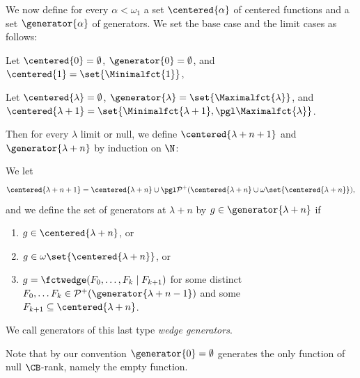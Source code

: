 We now define for every $\alpha<\omega_1$ a set $\centered{\alpha}$ of centered functions and a set $\generator{\alpha}$ of generators. 
We set the base case and the limit cases as follows:
\begin{descThm}
\item[Base case] Let $\centered{0}=\emptyset$, $\generator{0}=\emptyset$, and
$\centered{1}=\set{\Minimalfct{1}}$,
\item[Limit case $\lambda$] Let $\centered{\lambda}=\emptyset$, $\generator{\lambda}=\set{\Maximalfct{\lambda}}$, and
$\centered{\lambda+1}=\set{\Minimalfct{\lambda+1}, \pgl \Maximalfct{\lambda}}$.
\end{descThm}
Then for every $\lambda$ limit or null, we define $\centered{\lambda+n+1}$ and $\generator{\lambda+n}$ by induction on $\N$:
\begin{descThm}
\item[For $n>0$] We let 
\[\centered{\lambda+n+1}=\centered{\lambda+n}\cup \pgl \mathcal{P}^+( \centered{\lambda+n}\cup\omega\set{\centered{\lambda+n}} ),\]
and we define the set of generators at ${\lambda+n}$ by $g\in \generator{\lambda+n}$ if 
\begin{enumerate}
\item $g\in \centered{\lambda+n}$, or 
\item $g\in\omega\set{\centered{\lambda+n}}$, or 
\item $g=\fctwedge(F_0,\ldots, F_k \mid F_{k+1})$ for some distinct $F_0, \ldots F_k \in\mathcal{P}^+(\generator{\lambda+n-1})$ and some $F_{k+1}\subseteq\centered{\lambda+n}$.
\end{enumerate}
We call generators of this last type \emph{wedge generators}.
\end{descThm}

Note that by our convention $\generator{0}=\emptyset$ generates the only function of null $\CB$-rank, namely the empty function.

